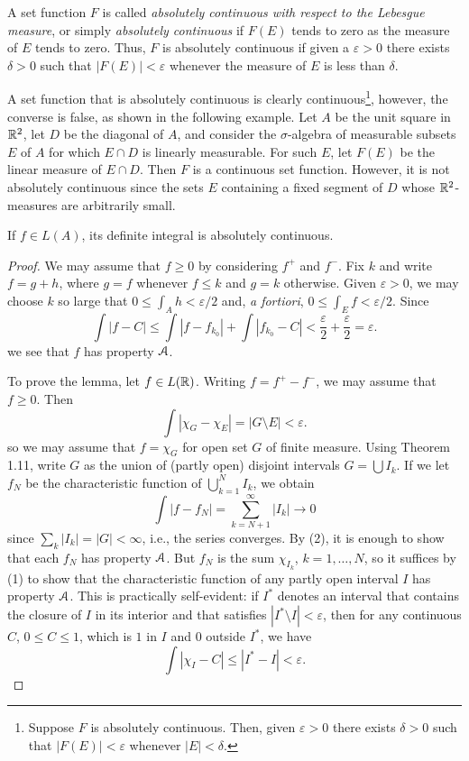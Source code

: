 A set function $F$ is called \emph{absolutely continuous with respect to
  the Lebesgue measure}, or simply \emph{absolutely continuous} if $F(E)$
tends to zero as the measure of $E$ tends to zero. Thus, $F$ is absolutely
continuous if given a $\varepsilon>0$ there exists $\delta>0$ such that
$|F(E)|<\varepsilon$ whenever the measure of $E$ is less than $\delta$.

A set function that is absolutely continuous is clearly
continuous\footnote{Suppose $F$ is absolutely continuous. Then, given
  $\varepsilon>0$ there exists $\delta>0$ such that $|F(E)|<\varepsilon$
  whenever $|E|<\delta$.}, however, the converse is false, as shown in the
following example. Let $A$ be the unit square in $\mathbb{R}^2$, let $D$ be the
diagonal of $A$, and consider the $\sigma$-algebra of measurable subsets
$E$ of $A$ for which $E\cap D$ is linearly measurable. For such $E$, let
$F(E)$ be the linear measure of $E\cap D$. Then $F$ is a continuous set
function. However, it is not absolutely continuous since the sets $E$
containing a fixed segment of $D$ whose $\mathbb{R}^2$-measures are arbitrarily
small.

\begin{theorem}[7.1]
If $f\in L(A)$, its definite integral is absolutely continuous.
\end{theorem}
\begin{proof}
We may assume that $f\geq 0$ by considering $f^+$ and $f^-$. Fix $k$ and
write $f=g+h$, where $g=f$ whenever $f\leq k$ and $g=k$ otherwise. Given
$\varepsilon>0$, we may choose $k$ so large that $0\leq\int_A
h<\varepsilon/2$ and, \emph{a fortiori}, $0\leq\int_E f<\varepsilon/2$.
Since
\[
\int|f-C|\leq\int|f-f_{k_0}|+\int|f_{k_0}-C|<\frac{\varepsilon}{2}+\frac{\varepsilon}{2}=\varepsilon.
\]
we see that $f$ has property $\mathcal{A}$.

To prove the lemma, let $f\in L(\mathbb{R})$. Writing $f=f^+-f^-$, we may assume
that $f\geq 0$. Then
\[
\int|\chi_G-\chi_E|=|G\setminus E|<\varepsilon.
\]
so we may assume that $f=\chi_G$ for open set $G$ of finite measure. Using
Theorem 1.11, write $G$ as the union of (partly open) disjoint intervals
$G=\bigcup I_k$. If we let $f_N$ be the characteristic function of
$\bigcup_{k=1}^N I_k$, we obtain
\[
\int|f-f_N|=\sum_{k=N+1}^\infty|I_k|\to 0
\]
since $\sum_k|I_k|=|G|<\infty$, i.e., the series converges. By (2), it is
enough to show that each $f_N$ has property $\mathcal{A}$. But $f_N$ is the sum
$\chi_{I_k}$, $k=1,\dotsc,N$, so it suffices by (1) to show that the
characteristic function of any partly open interval $I$ has property
$\mathcal{A}$. This is practically self-evident: if $I^*$ denotes an interval
that contains the closure of $I$ in its interior and that satisfies
$|I^*\setminus I|<\varepsilon$, then for any continuous $C$, $0\leq
C\leq 1$, which is $1$ in $I$ and $0$ outside $I^*$, we have
\[
\int|\chi_I-C|\leq|I^*-I|<\varepsilon.
\]
\end{proof}

